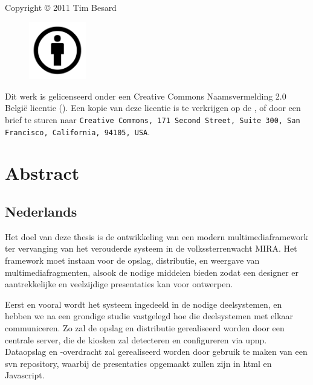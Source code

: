 %
%

\maketitle


%
%

\null
\vfill

Copyright © 2011 Tim Besard

\vspace{1cm}

\begin{figure}
\vspace{-10pt}
\centering
\includegraphics[width=2.5cm]{afbeeldingen/creative-commons-by}
\end{figure}

\noindent \nohyphens{Dit werk is gelicenseerd onder een Creative Commons Naamsvermelding 2.0 België licentie (). Een kopie van deze licentie is te verkrijgen op de , of door een brief te sturen naar \texttt{Creative Commons, 171 Second Street, Suite 300, San Francisco, California, 94105, USA}}.


%
%

\chapter*{Abstract}

\section*{Nederlands} Het doel van deze thesis is de ontwikkeling van een modern multimediaframework ter vervanging van het verouderde systeem in de volkssterrenwacht MIRA. Het framework moet instaan voor de opslag, distributie, en weergave van multimediafragmenten, alsook de nodige middelen bieden zodat een designer er aantrekkelijke en veelzijdige presentaties kan voor ontwerpen.

Eerst en vooral wordt het systeem ingedeeld in de nodige deelsystemen, en hebben we na een grondige studie vastgelegd hoe die deelsystemen met elkaar communiceren. Zo zal de opslag en distributie gerealiseerd worden door een centrale server, die de kiosken zal detecteren en configureren via \acs{upnp}. Dataopslag en -overdracht zal gerealiseerd worden door gebruik te maken van een \acs{svn} repository, waarbij de presentaties opgemaakt zullen zijn in \acs{html} en Javascript.

